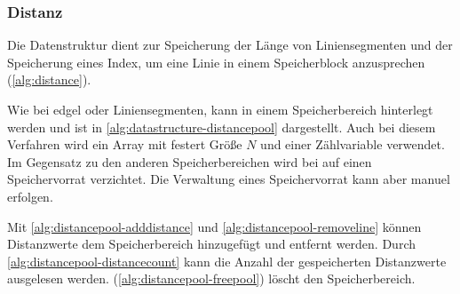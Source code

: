\subsubsection{Distanz} %
\label{sub:distanz}

Die Datenstruktur  dient zur Speicherung der Länge von Liniensegmenten und der Speicherung eines
 Index, um eine Linie in einem Speicherblock anzusprechen (\autoref{alg:distance}).



Wie bei \gls{edgel} oder Liniensegmenten, kann  in einem Speicherbereich hinterlegt werden und ist in
 \autoref{alg:datastructure-distancepool} dargestellt. Auch bei diesem Verfahren wird ein Array mit festert Größe $N$
 und einer Zählvariable verwendet. Im Gegensatz zu den anderen Speicherbereichen wird bei  auf einen
 Speichervorrat verzichtet. Die Verwaltung eines Speichervorrat kann aber manuel erfolgen.



Mit \autoref{alg:distancepool-adddistance} und \autoref{alg:distancepool-removeline} können Distanzwerte dem
 Speicherbereich hinzugefügt und entfernt werden. Durch \autoref{alg:distancepool-distancecount} kann die Anzahl der
 gespeicherten Distanzwerte ausgelesen werden.  (\autoref{alg:distancepool-freepool}) löscht den
 Speicherbereich.






